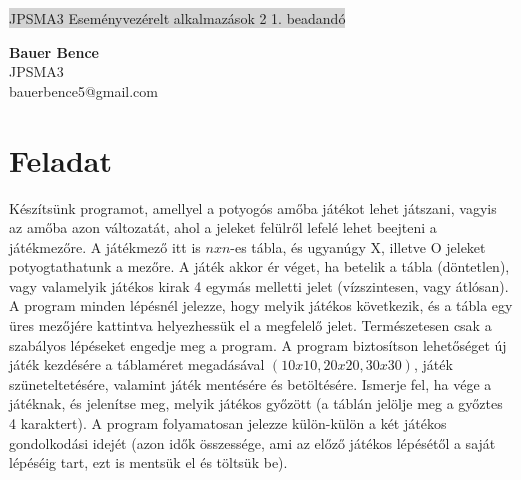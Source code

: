 \documentclass[11pt,a4paper]{article}
\begin{document}
\renewcommand{\labelitemi}{\textbullet}
\def\br{\\[0.1cm]}
\def\OldalKezdes{
\thispagestyle{empty}
\begin{center}
	\colorbox{lightgray}{{\large JPSMA3} \hspace{3cm} {\large Eseményvezérelt alkalmazások 2 1. beadandó} \hspace{5cm} \thepage}
\end{center}}
\OldalKezdes
\begin{framed}
	\begin{flushleft}
		{\large \textbf{Bauer Bence}}
		\hspace{5.4cm}{\large 2018.10.06.}\br
		{\large JPSMA3}\br
		{\large bauerbence5@gmail.com}
	\end{flushleft}
\end{framed}
\section{Feladat}
Készítsünk programot, amellyel a potyogós amőba játékot lehet játszani, vagyis
az amőba azon változatát, ahol a jeleket felülről lefelé lehet beejteni a
játékmezőre. A játékmező itt is $nxn$-es tábla, és ugyanúgy X, illetve O jeleket
potyogtathatunk a mezőre. A játék akkor ér véget, ha betelik a tábla (döntetlen),
vagy valamelyik játékos kirak 4 egymás melletti jelet (vízszintesen, vagy átlósan).
A program minden lépésnél jelezze, hogy melyik játékos következik, és a tábla
egy üres mezőjére kattintva helyezhessük el a megfelelő jelet. Természetesen
csak a szabályos lépéseket engedje meg a program.
A program biztosítson lehetőséget új játék kezdésére a táblaméret megadásával
$(10 x 10, 20 x 20, 30 x 30)$, játék szüneteltetésére, valamint játék mentésére és
betöltésére. Ismerje fel, ha vége a játéknak, és jelenítse meg, melyik játékos
győzött (a táblán jelölje meg a győztes 4 karaktert). A program folyamatosan
jelezze külön-külön a két játékos gondolkodási idejét (azon idők összessége, ami
az előző játékos lépésétől a saját lépéséig tart, ezt is mentsük el és töltsük be).
\end{document}
